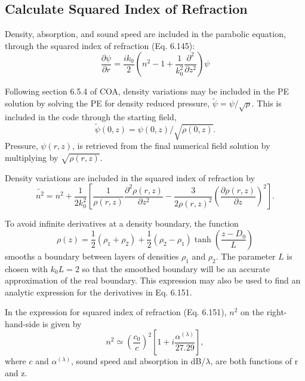 \documentclass[12pt]{article}
\begin{document}
 
\subsection{Calculate Squared Index of Refraction}
Density, absorption, and sound speed are included in the parabolic
equation, through the squared index of refraction (Eq. 6.145): 
\begin{equation}
	\frac{\partial\psi}{\partial r} = \frac{ik_0}{2} 
		\left( n^2 - 1 + \frac{1}{k_0^2} \frac{\partial^2}{\partial z^2} \right) \psi 
		\label{standard PE}
\end{equation}

Following section 6.5.4 of COA, density variations may be included in
the PE solution by solving the PE for density reduced pressure, 
$\widetilde{\psi} = \psi / \sqrt{\rho}.$ 
This is included in the code through the starting field, 
\[\widetilde{\psi}(0,z) = \psi(0,z) / \sqrt{\rho(0,z)}.\]
Pressure, $\psi(r,z)$, is retrieved from the final numerical field
solution by multiplying by $\sqrt{\rho(r,z)}$.

Density variations are included in the squared index of refraction by
\begin{equation}
	\widetilde{n^2} = n^2 + \frac{1}{2k_0^2}
		\left[
			\frac{1}{\rho(r,z)}\frac{\partial^2 \rho(r,z)}{\partial z^2} - 
			\frac{3}{2\rho(r,z)^2} \left(\frac{\partial\rho(r,z)}{\partial z} \right)^2
		\right]. \label{6.152}
\end{equation}

To avoid infinite derivatives at a density boundary, the function 
\begin{equation}
	\rho(z) = \frac{1}{2}(\rho_1 + \rho_2) + \frac{1}{2}(\rho_2 - \rho_1) 
				\tanh \left(\frac{z - D_0}{L} \right) \label{6.153}
\end{equation}
smooths a boundary between layers of densities $\rho_1$ and $\rho_2$.
The parameter $L$ is chosen with $k_0L = 2$ so that the smoothed
boundary will be an accurate approximation of the real boundary. This
expression may also be used to find an analytic expression for the
derivatives in Eq. 6.151.

In the expression for squared index of refraction (Eq. 6.151), $n^2$
on the right-hand-side is given by 
\begin{equation}
	n^2 \simeq \left(\frac{c_0}{c}\right)^2 
			\left[ 1 + i\frac{\alpha^{(\lambda)}}{27.29} \right],
\end{equation}
where $c$ and $\alpha^{(\lambda)}$, sound speed and absorption in
dB/$\lambda$, are both functions of r and z.
\end{document}
